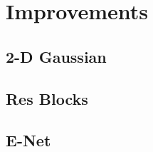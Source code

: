 
\chapter{Improvements}
\begin{spacing}{1.5}
\setlength{\parskip}{0.3in}

\section{2-D Gaussian}

\section{Res Blocks}

\section{E-Net}



\end{spacing}
\newpage
